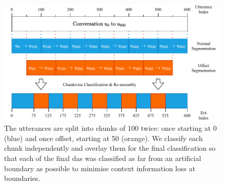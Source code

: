     \begin{figure}
        \centering
        \includegraphics[width=\textwidth]{figures/chunks.pdf}
        \caption{The \glspl{utterance} are split into chunks of 100 twice: once starting at 0 (blue) and once offset, starting at 50 (orange). We classify each chunk independently and overlay them for the final classification so that each of the final \glspl{da} was classified as far from an artificial boundary as possible to minimise context information loss at boundaries.}
        \label{fig:chunking process}
    \end{figure}

